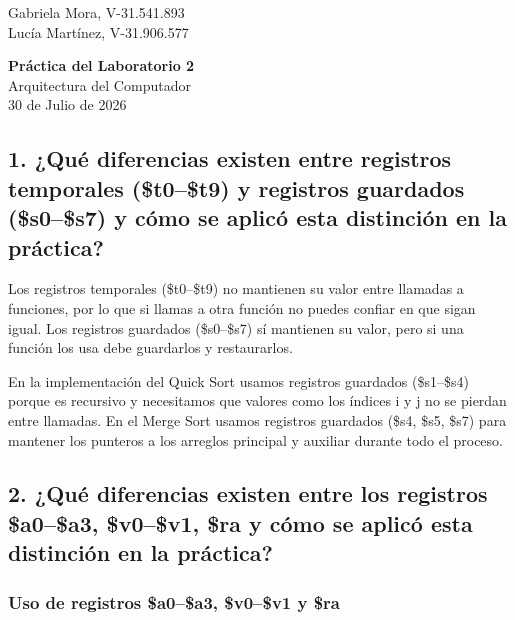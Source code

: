 \documentclass[12pt]{article}
\begin{document}
\begin{flushright}
Gabriela Mora, V-31.541.893 \\
Lucía Martínez, V-31.906.577 \\
\end{flushright}

\vspace{1cm}

\begin{center}
\LARGE\textbf{Práctica del Laboratorio 2} \\
\vspace{0.3cm}
\large Arquitectura del Computador \\
\vspace{0.3cm}
\normalsize 30 de Julio de 2026
\end{center}

\vspace{1cm}

\subsection*{1. ¿Qué diferencias existen entre registros temporales (\$t0–\$t9) y registros guardados (\$s0–\$s7) y cómo se aplicó esta distinción en la práctica?}

Los registros temporales (\$t0–\$t9) no mantienen su valor entre llamadas a funciones, por lo que si llamas a otra función no puedes confiar en que sigan igual. Los registros guardados (\$s0–\$s7) sí mantienen su valor, pero si una función los usa debe guardarlos y restaurarlos.

En la implementación del Quick Sort usamos registros guardados (\$s1–\$s4) porque es recursivo y necesitamos que valores como los índices i y j no se pierdan entre llamadas. En el Merge Sort usamos registros guardados (\$s4, \$s5, \$s7) para mantener los punteros a los arreglos principal y auxiliar durante todo el proceso.

\subsection*{2. ¿Qué diferencias existen entre los registros \$a0–\$a3, \$v0–\$v1, \$ra y cómo se aplicó esta distinción en la práctica?}

\subsubsection*{Uso de registros \$a0–\$a3, \$v0–\$v1 y \$ra}
\end{document}
